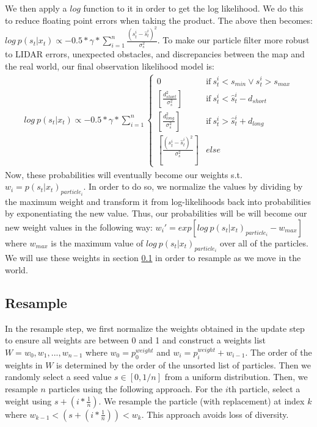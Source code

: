We then apply a $log$ function to it in order to get the log likelihood. We do this to reduce floating point errors when taking the product. The above then becomes: $log~p(s_t | x_t) \propto -0.5 * \gamma * \sum_{i=1}^n \frac{(s_t^i - \hat{s}_t^i)^2}{\sigma_s^2}$. To make our particle filter more robust to LIDAR errors, unexpected obstacles, and discrepancies between the map and the real world, our final observation likelihood model is:
\begin{align*}
    log~p(s_t | x_t) \propto -0.5 * \gamma * \sum_{i=1}^n \begin{cases}
        0 & \mathrm{if} ~ s_t^i < s_{min} \lor s_t^i > s_{max}  \\
        [\frac{d_{short}^2}{\sigma_s^2}] & \mathrm{if} ~ s_t^i < \hat{s}_t^i - d_{short} \\
        [\frac{d_{long}^2}{\sigma_s^2}] & \mathrm{if} ~ s_t^i > \hat{s}_t^i +d_{long} \\
        [\frac{(s_t^i - \hat{s}_t^i)^2}{\sigma_s^2}]& else 
    \end{cases}
\end{align*}
Now, these probabilities will eventually become our weights s.t. $w_i = p(s_t | x_t)_{particle_i}$. In order to do so, we normalize the values by dividing by the maximum weight and transform it from log-likelihoods back into probabilities by exponentiating the new value. Thus, our probabilities will be will become our new weight values in the following way: $w_i' = exp[log~p(s_t | x_t)_{particle_i} - w_{max}]$ where $w_{max}$ is the maximum value of $log~p(s_t | x_t)_{particle_i}$ over all of the particles. We will use these weights in section \ref{resample} in order to resample as we move in the world.

\subsection{Resample}
\label{resample}


In the resample step, we first normalize the weights obtained in the update step to ensure all weights are between 0 and 1 and construct a weights list $W = w_0, w_1, ..., w_{n-1}$ where $w_0 = p_0^{weight}$ and $w_i = p_i^{weight} + w_{i-1}$. The order of the weights in $W$ is determined by the order of the unsorted list of particles. Then we randomly select a seed value $s \in [0, 1/n]$ from a uniform distribution. Then, we resample $n$ particles using the following approach. For the $i$th particle, select a weight using $s + (i * \frac1n)$. We resample the particle (with replacement) at index $k$ where $w_{k - 1} < (s + (i * \frac1n)) < w_{k}$. This approach avoids loss of diversity.

